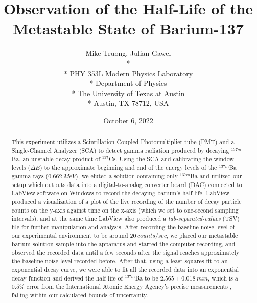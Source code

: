 \documentclass[10pt,letterpaper,onecolumn]{article}
\begin{document}

\title{\Large\bf Observation of the Half-Life of the Metastable State of Barium-137}

\author{
 Mike Truong, Julian Gawel \\*
  \\*
 PHY 353L Modern Physics Laboratory \\*
 Department of Physics \\*
 The University of Texas at Austin \\*
 Austin, TX 78712, USA
}
\date{October 6, 2022}


\maketitle


\begin{abstract}


This experiment utilizes a Scintillation-Coupled Photomultiplier tube (PMT) and a Single-Channel Analyzer (SCA) to detect gamma radiation produced by decaying $^{137m}$Ba, an unstable decay product of $^{137}$Cs. Using the SCA and calibrating the window levels ($\Delta E$) to the approximate beginning and end of the energy levels of the $^{137m}$Ba gamma rays ($0.662\ MeV$), we eluted a solution containing only $^{137m}$Ba and utilized our setup which outputs data into a digital-to-analog converter board (DAC) connected to LabView software on Windows to record the decaying barium's half-life. LabView produced a visualization of a plot of the live recording of the number of decay particle counts on the y-axis against time on the x-axis (which we set to one-second sampling intervals), and at the same time LabView also produced a {\it tab-separated-values} (TSV) file for further manipulation and analysis. After recording the baseline noise level of our experimental environment to be around $20\ counts/sec$, we placed our metastable barium solution sample into the apparatus and started the computer recording, and observed the recorded data until a few seconds after the signal reaches approximately the baseline noise level recorded before. After that, using a least-squares fit to an exponential decay curve, we were able to fit all the recorded data into an exponential decay function and derived the half-life of $^{137m}$Ba to be $2.565\pm 0.018\ min$, which is a $0.5\%$ error from the International Atomic Energy Agency's precise measurements \cite{IAEA}, falling within our calculated bounds of uncertainty.


\end{abstract}
\end{document}
